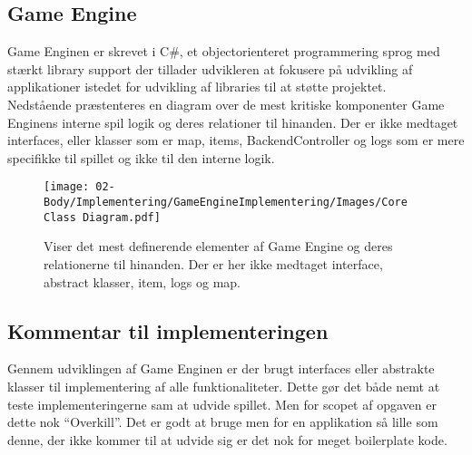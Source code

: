 \subsection{Game Engine}
Game Enginen er skrevet i C\#, et objectorienteret programmering sprog
med stærkt library support der tillader udvikleren at fokusere på udvikling
af applikationer istedet for udvikling af libraries til at støtte projektet. \\

\noindent Nedstående præstenteres en diagram over de mest kritiske komponenter
Game Enginens interne spil logik og deres relationer til hinanden.
Der er ikke medtaget interfaces, eller klasser som er map, items, BackendController 
og logs som er mere specifikke til spillet og ikke til den interne logik.\\

\begin{figure}[h]
  \centering
   \caption{Viser det mest definerende elementer af Game Engine og deres relationerne til hinanden. Der er her ikke medtaget interface,
           abstract klasser, item, logs og map. }%
  \texttt{[image: 02-Body/Implementering/GameEngineImplementering/Images/Core Class Diagram.pdf]}
  \label{fig:CoreClassDiagram}
\end{figure}





\subsection{Kommentar til implementeringen}

Gennem udviklingen af Game Enginen er der brugt interfaces eller abstrakte 
klasser til implementering af alle funktionaliteter. Dette gør det både nemt
at teste implementeringerne sam at udvide spillet. Men for scopet af opgaven
er dette nok ``Overkill''. Det er godt at bruge men for en applikation så 
lille som denne, der ikke kommer til at udvide sig er det nok for meget 
boilerplate kode. 




